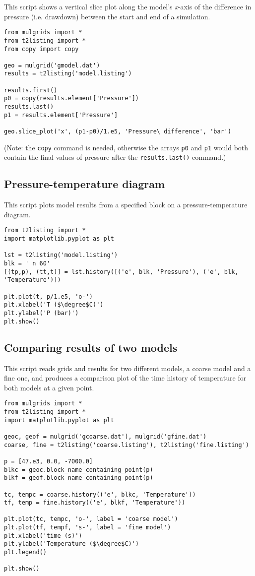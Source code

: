 This script shows a vertical slice plot along the model's \emph{x}-axis of the difference in pressure (i.e. drawdown) between the start and end of a simulation.

\begin{lstlisting}
from mulgrids import *
from t2listing import *
from copy import copy

geo = mulgrid('gmodel.dat')
results = t2listing('model.listing')

results.first()
p0 = copy(results.element['Pressure'])
results.last()
p1 = results.element['Pressure']

geo.slice_plot('x', (p1-p0)/1.e5, 'Pressure\ difference', 'bar')
\end{lstlisting}

(Note: the \texttt{copy} command is needed, otherwise the arrays \texttt{p0} and \texttt{p1} would both contain the final values of pressure after the \texttt{results.last()} command.)

\subsection{Pressure-temperature diagram}

This script plots model results from a specified block on a pressure-temperature diagram.

\begin{lstlisting}
from t2listing import *
import matplotlib.pyplot as plt

lst = t2listing('model.listing')
blk = ' n 60'
[(tp,p), (tt,t)] = lst.history([('e', blk, 'Pressure'), ('e', blk, 'Temperature')])

plt.plot(t, p/1.e5, 'o-')
plt.xlabel('T ($\degree$C)')
plt.ylabel('P (bar)')
plt.show()
\end{lstlisting}

\subsection{Comparing results of two models}
\label{comparison_example}

This script reads grids and results for two different models, a coarse model and a fine one, and produces a comparison plot of the time history of temperature for both models at a given point.

\begin{lstlisting}
from mulgrids import *
from t2listing import *
import matplotlib.pyplot as plt

geoc, geof = mulgrid('gcoarse.dat'), mulgrid('gfine.dat')
coarse, fine = t2listing('coarse.listing'), t2listing('fine.listing')

p = [47.e3, 0.0, -7000.0]
blkc = geoc.block_name_containing_point(p)
blkf = geof.block_name_containing_point(p)

tc, tempc = coarse.history(('e', blkc, 'Temperature'))
tf, temp = fine.history(('e', blkf, 'Temperature'))

plt.plot(tc, tempc, 'o-', label = 'coarse model')
plt.plot(tf, tempf, 's-', label = 'fine model')
plt.xlabel('time (s)')
plt.ylabel('Temperature ($\degree$C)')
plt.legend()

plt.show()
\end{lstlisting}

